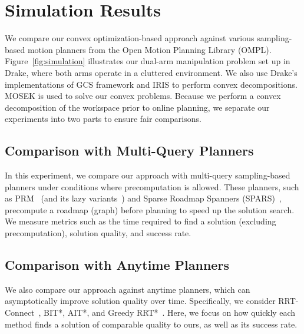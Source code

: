 \section{Simulation Results}\label{sec:results}

We compare our convex optimization-based approach against various sampling-based motion planners from the Open Motion Planning Library (OMPL)\cite{sucan2012open}.
Figure~\ref{fig:simulation} illustrates our dual-arm manipulation problem set up in Drake, where both arms operate in a cluttered environment.
We also use Drake's implementations of GCS framework and IRIS to perform convex decompositions.
MOSEK is used to solve our convex problems.
Because we perform a convex decomposition of the workspace prior to online planning, we separate our experiments into two parts to ensure fair comparisons.

\subsection{Comparison with Multi-Query Planners}

In this experiment, we compare our approach with multi-query sampling-based planners under conditions where precomputation is allowed.
These planners, such as PRM~\cite{kavraki1996probabilistic} (and its lazy variants~\cite{bohlin2000path}) and Sparse Roadmap Spanners (SPARS)~\cite{dobson2014sparse}, precompute a roadmap (graph) before planning to speed up the solution search.
We measure metrics such as the time required to find a solution (excluding precomputation), solution quality, and success rate.

\subsection{Comparison with Anytime Planners}

We also compare our approach against anytime planners, which can asymptotically improve solution quality over time.
Specifically, we consider RRT-Connect~\cite{kuffner2000rrt}, BIT*\cite{gammell2020batch}, AIT*\cite{strub2020adaptively}, and Greedy RRT*~\cite{kyaw2024greedy}.
Here, we focus on how quickly each method finds a solution of comparable quality to ours, as well as its success rate.
